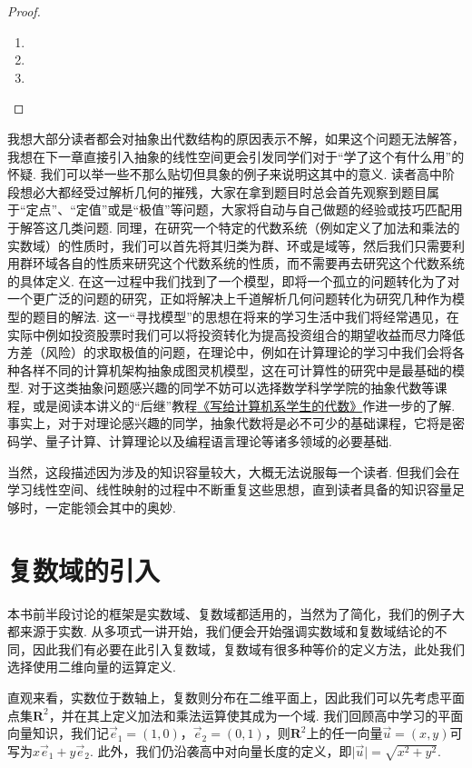 \begin{proof}
\begin{enumerate}
    \item
    \item
    \item
\end{enumerate}
\end{proof}

我想大部分读者都会对抽象出代数结构的原因表示不解，如果这个问题无法解答，我想在下一章直接引入抽象的线性空间更会引发同学们对于``学了这个有什么用''的怀疑. 我们可以举一些不那么贴切但具象的例子来说明这其中的意义. 读者高中阶段想必大都经受过解析几何的摧残，大家在拿到题目时总会首先观察到题目属于``定点''、``定值''或是``极值''等问题，大家将自动与自己做题的经验或技巧匹配用于解答这几类问题. 同理，在研究一个特定的代数系统（例如定义了加法和乘法的实数域）的性质时，我们可以首先将其归类为群、环或是域等，然后我们只需要利用群环域各自的性质来研究这个代数系统的性质，而不需要再去研究这个代数系统的具体定义. 在这一过程中我们找到了一个模型，即将一个孤立的问题转化为了对一个更广泛的问题的研究，正如将解决上千道解析几何问题转化为研究几种作为模型的题目的解法. 这一``寻找模型''的思想在将来的学习生活中我们将经常遇见，在实际中例如投资股票时我们可以将投资转化为提高投资组合的期望收益而尽力降低方差（风险）的求取极值的问题，在理论中，例如在计算理论的学习中我们会将各种各样不同的计算机架构抽象成图灵机模型，这在可计算性的研究中是最基础的模型. 对于这类抽象问题感兴趣的同学不妨可以选择数学科学学院的抽象代数等课程，或是阅读本讲义的``后继''教程\href{https://frightenedfoxcn.github.io/notes/series/alg-for-cs/}{《写给计算机系学生的代数》}作进一步的了解. 事实上，对于对理论感兴趣的同学，抽象代数将是必不可少的基础课程，它将是密码学、量子计算、计算理论以及编程语言理论等诸多领域的必要基础.

当然，这段描述因为涉及的知识容量较大，大概无法说服每一个读者. 但我们会在学习线性空间、线性映射的过程中不断重复这些思想，直到读者具备的知识容量足够时，一定能领会其中的奥妙.

\section{复数域的引入}

本书前半段讨论的框架是实数域、复数域都适用的，当然为了简化，我们的例子大都来源于实数. 从多项式一讲开始，我们便会开始强调实数域和复数域结论的不同，因此我们有必要在此引入复数域，复数域有很多种等价的定义方法，此处我们选择使用二维向量的运算定义.

直观来看，实数位于数轴上，复数则分布在二维平面上，因此我们可以先考虑平面点集$\mathbf{R}^2$，并在其上定义加法和乘法运算使其成为一个域. 我们回顾高中学习的平面向量知识，我们记$\vec{e}_1=(1,0)$，$\vec{e}_2=(0,1)$，则$\mathbf{R}^2$上的任一向量$\vec{u}=(x,y)$可写为$x\vec{e}_1+y\vec{e}_2$. 此外，我们仍沿袭高中对向量长度的定义，即$\lvert\vec{u}\rvert=\sqrt{x^2+y^2}$.

